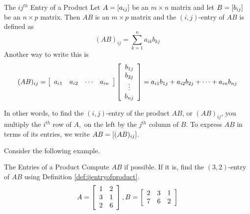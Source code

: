 \begin{definition}{The $ij^{th}$ Entry of a Product}\label{def:ijentryofproduct}
Let $A=\left[ a_{ij}\right] $ be an $m\times n$ matrix and
let $B=\left[ b_{ij}\right] $ be an $n\times p$ matrix. Then $AB$ is an 
$m\times p$ matrix and the $\left( i, j \right)$-entry of $AB$  is defined as 
\begin{equation*}
(AB)_{ij}=\sum_{k=1}^{n}a_{ik}b_{kj}  
\label{mat12}
\end{equation*}
Another way to write this is
\begin{equation*}
(AB)_{ij}=\left[
\begin{array}{cccc}
a_{i1} & a_{i2} & \cdots & a_{in}
\end{array}
\right] \left[
\begin{array}{c}
b_{1j} \\
b_{2j} \\
\vdots \\
b_{nj}
\end{array}
\right]
= 
a_{i1}b_{1j} + a_{i2}b_{2j} + \cdots + a_{in}b_{nj}
\end{equation*}
\end{definition}

In other words, to find the $\left( i, j \right)$-entry of the product $AB$, or $(AB)_{ij}$,
you multiply the $i^{th}$ row of 
$A,$ on the left by the $j^{th}$ column of $B$. To express $AB$ in terms of its entries, we write $AB = \left[ (AB)_{ij} \right]$.

Consider the following example. 

\begin{example}{The Entries of a Product}\label{exa:entriesofproduct1}
Compute $AB$ if possible. If it is, find the $\left( 3,2 \right)$-entry of $AB$ using Definition \ref{def:ijentryofproduct}. 
\begin{equation*}
A = \left[
\begin{array}{cc}
1 & 2 \\
3 & 1 \\
2 & 6
\end{array}
\right], B = \left[
\begin{array}{ccc}
2 & 3 & 1 \\
7 & 6 & 2
\end{array}
\right]
\end{equation*}
\end{example}

